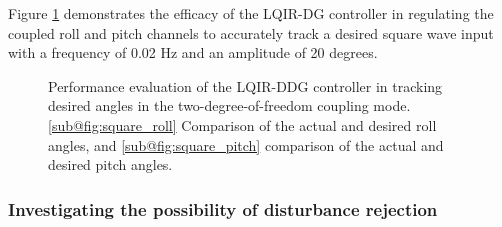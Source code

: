\documentclass[3p,times]{elsarticle}
\begin{document}
Figure \ref{fig:square} demonstrates the efficacy of the LQIR-DG controller in regulating the coupled roll and pitch channels to accurately track a desired square wave input with a frequency of 0.02 Hz and an amplitude of 20 degrees.


\begin{figure}[H]
	\centering
	\caption{Performance evaluation of the LQIR-DDG controller in tracking desired angles in the two-degree-of-freedom coupling mode. \ref{sub@fig:square_roll} Comparison of the actual and desired roll angles, and \ref{sub@fig:square_pitch} comparison of the actual and desired pitch angles.}
	\label{fig:square}
\end{figure}

\subsubsection{Investigating the possibility of disturbance rejection}\label{sec:disturbance}
\end{document}
